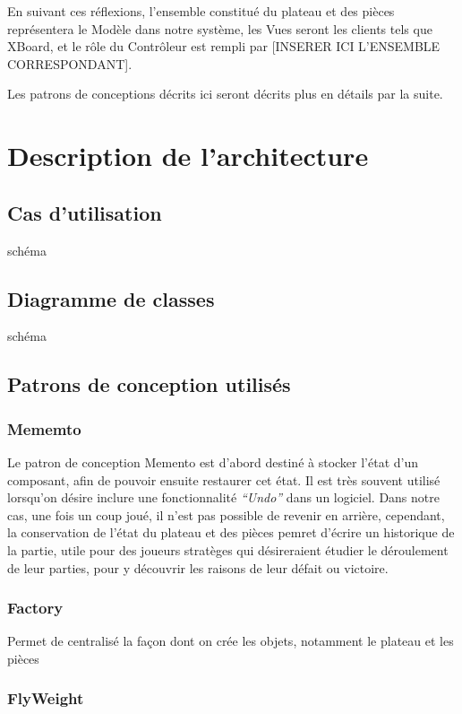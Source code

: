 \documentclass[11pt]{article}
\begin{document}
En suivant ces réflexions, l'ensemble constitué du plateau et des pièces représentera le Modèle dans notre système, les Vues seront les clients tels que XBoard, et le rôle du Contrôleur est rempli par [INSERER ICI L'ENSEMBLE CORRESPONDANT].

Les patrons de conceptions décrits ici seront décrits plus en détails par la suite.
\section{Description de l’architecture}
\label{sec-3}
\subsection{Cas d'utilisation}
\label{sec-3-1}

   schéma
\subsection{Diagramme de classes}
\label{sec-3-2}

   schéma
\subsection{Patrons de conception utilisés}
\label{sec-3-3}
\subsubsection{Mememto}
\label{sec-3-3-1}
Le patron de conception Memento est d'abord destiné à stocker l'état d'un composant, afin de pouvoir ensuite restaurer cet état. Il est très souvent utilisé lorsqu'on désire inclure une fonctionnalité \emph{``Undo''} dans un logiciel. Dans notre cas, une fois un coup joué, il n'est pas possible de revenir en arrière, cependant, la conservation de l'état du plateau et des pièces pemret d'écrire un historique de la partie, utile pour des joueurs stratèges qui désireraient étudier le déroulement de leur parties, pour y découvrir les raisons de leur défait ou victoire.
\subsubsection{Factory}
\label{sec-3-3-2}

    Permet de centralisé la façon dont on crée les objets, notamment le plateau et les pièces
\subsubsection{FlyWeight}
\label{sec-3-3-3}
\end{document}
